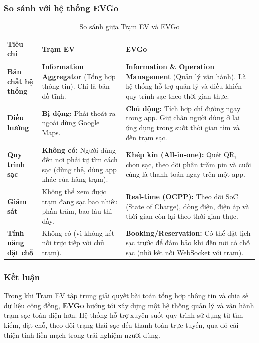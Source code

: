 \subsubsection{So sánh với hệ thống EVGo}
\begin{table}[H]
    \centering
    \caption{So sánh giữa Trạm EV và EVGo}
    \label{tab:compare_ev_apps}
    \begin{tabular}{|l|p{5cm}|p{5cm}|}
        \hline
        \textbf{Tiêu chí} & \textbf{Trạm EV} & \textbf{EVGo} \\
        \hline
        \textbf{Bản chất hệ thống} & \textbf{Information Aggregator} (Tổng hợp thông tin). Chỉ là bản đồ tĩnh. & \textbf{Information \& Operation Management} (Quản lý vận hành). Là hệ thống hỗ trợ quản lý và điều khiển quy trình sạc theo thời gian thực. \\
        \hline
        \textbf{Điều hướng} & \textbf{Bị động:} Phải thoát ra ngoài dùng Google Maps. & \textbf{Chủ động:} Tích hợp chỉ đường ngay trong app. Giữ chân người dùng ở lại ứng dụng trong suốt thời gian tìm và đến trạm sạc. \\
        \hline
        \textbf{Quy trình sạc} & \textbf{Không có:} Người dùng đến nơi phải tự tìm cách sạc (dùng thẻ, dùng app khác của hãng trạm). & \textbf{Khép kín (All-in-one):} Quét QR, chọn sạc, theo dõi phần trăm pin và cuối cùng là thanh toán ngay trên một app. \\
        \hline
        \textbf{Giám sát} & Không thể xem được trạm đang sạc bao nhiêu phần trăm, bao lâu thì đầy. & \textbf{Real-time (OCPP):} Theo dõi SoC (State of Charge), dòng điện, điện áp và thời gian còn lại theo thời gian thực. \\
        \hline
        \textbf{Tính năng đặt chỗ} & Không có (vì không kết nối trực tiếp với chủ trạm). & \textbf{Booking/Reservation:} Có thể đặt lịch sạc trước để đảm bảo khi đến nơi có chỗ sạc (nhờ kết nối WebSocket với trạm). \\
        \hline
    \end{tabular}
    
\end{table}

\subsubsection{Kết luận}
Trong khi Trạm EV tập trung giải quyết bài toán tổng hợp thông tin và chia sẻ dữ liệu cộng đồng, \textbf{EVGo} hướng tới xây dựng một hệ thống quản lý và vận hành trạm sạc toàn diện hơn. Hệ thống hỗ trợ xuyên suốt quy trình sử dụng từ tìm kiếm, đặt chỗ, theo dõi trạng thái sạc đến thanh toán trực tuyến, qua đó cải thiện tính liền mạch trong trải nghiệm người dùng.
